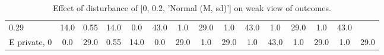 \begin{table}
\begin{tabular}{l|cc|cc|cc|cc|cc|cc|cc}
\cellcolor{Bittersweet}0.29&\cellcolor{Bittersweet}14.0&\cellcolor{Bittersweet}0.55&\cellcolor{Bittersweet}14.0&\cellcolor{Bittersweet}0.0&\cellcolor{Bittersweet}43.0&\cellcolor{Bittersweet}1.0&\cellcolor{Bittersweet}29.0&\cellcolor{Bittersweet}1.0&\cellcolor{Bittersweet}43.0&\cellcolor{Bittersweet}1.0&\cellcolor{Bittersweet}29.0&\cellcolor{Bittersweet}1.0&\cellcolor{Bittersweet}43.0\\E private, 0 & \cellcolor{Bittersweet}0.0&\cellcolor{Bittersweet}29.0&\cellcolor{Bittersweet}0.55&\cellcolor{Bittersweet}14.0&\cellcolor{Bittersweet}0.0&\cellcolor{Bittersweet}29.0&\cellcolor{Bittersweet}1.0&\cellcolor{Bittersweet}29.0&\cellcolor{Bittersweet}1.0&\cellcolor{Bittersweet}43.0&\cellcolor{Bittersweet}1.0&\cellcolor{Bittersweet}29.0&\cellcolor{Bittersweet}1.0&\cellcolor{Bittersweet}29.0\\\bottomrule\end{tabular}\caption{Effect of disturbance of [0, 0.2, 'Normal (M, sd)'] on weak view of outcomes.}\end{table}